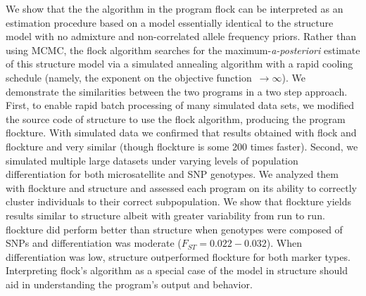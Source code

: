 
      We show that the the algorithm in the program {\sc flock} \citep{Duc&Tur2009} can be
interpreted as an estimation procedure based on 
a model essentially identical to the {\sc structure} 
\citep{Pritchardetal2000} model with no admixture and non-correlated 
allele frequency priors. Rather than using MCMC, the {\sc flock} algorithm 
searches for the maximum-{\em a-posteriori}
estimate of this {\sc structure} model via a simulated 
annealing algorithm with a rapid cooling 
schedule (namely, the exponent on the objective function~$\rightarrow \infty$).  We 
demonstrate the similarities between the two programs in a two step approach. First,
to enable rapid batch processing of many simulated data sets,
we modified the source code of  {\sc structure} to use the {\sc flock} algorithm, producing
the program {\sc flockture}. With simulated data we confirmed that results obtained with
{\sc flock}  and {\sc flockture} and very similar (though flockture is some 200 times faster). 
Second, we simulated multiple large datasets under varying 
levels of population differentiation for both microsatellite and SNP genotypes. We analyzed them
with {\sc flockture} and {\sc structure} and assessed each program on its ability to correctly cluster
individuals to their correct subpopulation.  We show that
{\sc flockture} yields results similar to {\sc structure} albeit with greater 
variability from run to run. {\sc flockture} did perform better than {\sc structure} 
when genotypes were composed of SNPs and differentiation was moderate 
($F_{ST}=0.022-0.032$). When differentiation was low, {\sc structure} outperformed {\sc flockture}
for both marker types. Interpreting {\sc flock}'s algorithm as a special case of the model in 
{\sc structure} should aid in understanding the program's output and behavior. 

